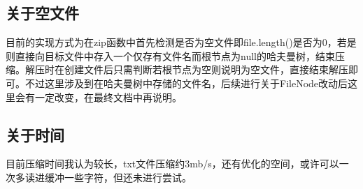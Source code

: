 \documentclass[11pt,a4paper]{article}
\begin{document}
\subsection*{关于空文件}
\par{目前的实现方式为在zip函数中首先检测是否为空文件即file.length()是否为0，若是则直接向目标文件中存入一个仅存有文件名而根节点为null的哈夫曼树，结束压缩。解压时在创建文件后只需判断若根节点为空则说明为空文件，直接结束解压即可。不过这里涉及到在哈夫曼树中存储的文件名，后续进行关于FileNode改动后这里会有一定改变，在最终文档中再说明。}
\subsection*{关于时间}
\par{目前压缩时间我认为较长，txt文件压缩约3mb/s，还有优化的空间，或许可以一次多读进缓冲一些字符，但还未进行尝试。}
\end{document}

